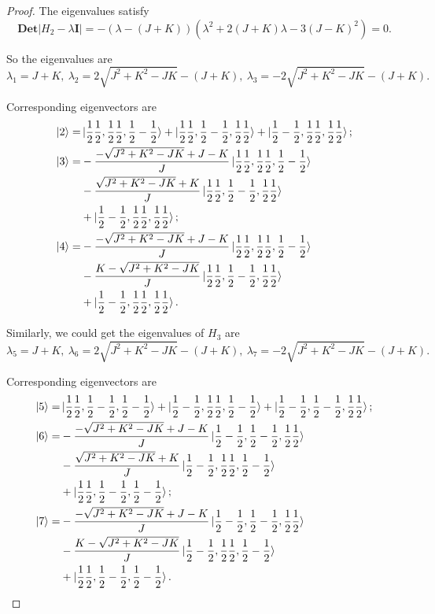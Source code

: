 \documentclass[reqno,a4paper,12pt]{amsart}
\begin{document}
\begin{enumerate}[1.]
\begin{proof}
The eigenvalues satisfy 
\[
	\mathbf{Det} \vert H_2 - \lambda \mathbf{I} \vert = -(\lambda - (J+K)) (\lambda^2 + 2(J+K)\lambda -3(J-K)^2) = 0.
\]

So the eigenvalues are 
\[
	\lambda_1 = J+K, \ \lambda_2 = 2\sqrt{J^2+K^2-JK} - (J+K), \ \lambda_3 = -2\sqrt{J^2+K^2-JK} - (J+K).
\]

Corresponding eigenvectors are 
\begin{align*}
	\ket{2} =& \ket{\frac{1}{2}\frac{1}{2},\frac{1}{2}\frac{1}{2},\frac{1}{2}-\frac{1}{2}} + \ket{\frac{1}{2}\frac{1}{2},\frac{1}{2}-\frac{1}{2},\frac{1}{2}\frac{1}{2}} + \ket{\frac{1}{2}-\frac{1}{2},\frac{1}{2}\frac{1}{2},\frac{1}{2}\frac{1}{2}}; \\
	\ket{3} =& -\frac{-\sqrt{J^2+K^2-JK} + J-K}{J} \ket{\frac{1}{2}\frac{1}{2},\frac{1}{2}\frac{1}{2}, \frac{1}{2}-\frac{1}{2}} \\
	&-\frac{\sqrt{J^2+K^2-JK}+K}{J} \ket{\frac{1}{2}\frac{1}{2},\frac{1}{2}-\frac{1}{2}, \frac{1}{2}\frac{1}{2}} \\
	& + \ket{\frac{1}{2}-\frac{1}{2},\frac{1}{2}\frac{1}{2}, \frac{1}{2}\frac{1}{2}}; \\
	\ket{4} =& -\frac{-\sqrt{J^2+K^2-JK} + J-K}{J} \ket{\frac{1}{2}\frac{1}{2},\frac{1}{2}\frac{1}{2}, \frac{1}{2}-\frac{1}{2}} \\
	&-\frac{K-\sqrt{J^2+K^2-JK}}{J} \ket{\frac{1}{2}\frac{1}{2},\frac{1}{2}-\frac{1}{2}, \frac{1}{2}\frac{1}{2}} \\
	& + \ket{\frac{1}{2}-\frac{1}{2},\frac{1}{2}\frac{1}{2}, \frac{1}{2}\frac{1}{2}}.
\end{align*}

Similarly, we could get the eigenvalues of $H_3$ are 
\[
	\lambda_5 = J+K, \ \lambda_6 = 2\sqrt{J^2+K^2-JK} - (J+K), \ \lambda_7 = -2\sqrt{J^2+K^2-JK} - (J+K).
\]

Corresponding eigenvectors are 
\begin{align*}
	\ket{5} =& \ket{\frac{1}{2}\frac{1}{2},\frac{1}{2}-\frac{1}{2},\frac{1}{2}-\frac{1}{2}} + \ket{\frac{1}{2}-\frac{1}{2},\frac{1}{2}\frac{1}{2},\frac{1}{2}-\frac{1}{2}} + \ket{\frac{1}{2}-\frac{1}{2},\frac{1}{2}-\frac{1}{2},\frac{1}{2}\frac{1}{2}}; \\
	\ket{6} =& -\frac{-\sqrt{J^2+K^2-JK} + J-K}{J} \ket{\frac{1}{2}-\frac{1}{2},\frac{1}{2}-\frac{1}{2}, \frac{1}{2}\frac{1}{2}} \\
	&-\frac{\sqrt{J^2+K^2-JK}+K}{J} \ket{\frac{1}{2}-\frac{1}{2},\frac{1}{2}\frac{1}{2}, \frac{1}{2}-\frac{1}{2}} \\
	& + \ket{\frac{1}{2}\frac{1}{2},\frac{1}{2}-\frac{1}{2}, \frac{1}{2}-\frac{1}{2}}; \\
	\ket{7} =& -\frac{-\sqrt{J^2+K^2-JK} + J-K}{J} \ket{\frac{1}{2}-\frac{1}{2},\frac{1}{2}-\frac{1}{2}, \frac{1}{2}\frac{1}{2}} \\
	&-\frac{K-\sqrt{J^2+K^2-JK}}{J} \ket{\frac{1}{2}-\frac{1}{2},\frac{1}{2}\frac{1}{2}, \frac{1}{2}-\frac{1}{2}} \\
	& + \ket{\frac{1}{2}\frac{1}{2},\frac{1}{2}-\frac{1}{2}, \frac{1}{2}-\frac{1}{2}}.
\end{align*}


\end{proof}
\end{enumerate}
\end{document}
